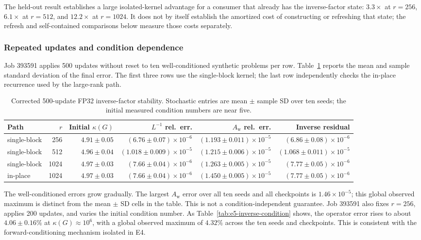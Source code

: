 \documentclass[11pt]{article}
\newcommand{\Aw}{A_{\mathrm w}}
\begin{document}
The held-out result establishes a large isolated-kernel advantage for a
consumer that already has the inverse-factor state: \(3.3\times\) at
\(r=256\), \(6.1\times\) at \(r=512\), and \(12.2\times\) at
\(r=1024\).  It does not by itself establish the amortized cost of constructing
or refreshing that state; the refresh and self-contained comparisons below
measure those costs separately.

\subsubsection{Repeated updates and condition dependence}

Job 393591 applies 500 updates without reset to ten well-conditioned
synthetic problems per row.  Table~\ref{tab:e5-inverse-stability} reports the
mean and sample standard deviation of the final error.  The first three rows
use the single-block
kernel; the last row independently checks the in-place recurrence used by the
large-rank path.

\begin{table}[ht]
\centering
\scriptsize
\caption{Corrected 500-update FP32 inverse-factor stability.  Stochastic
entries are mean \(\pm\) sample SD over ten seeds; the initial measured
condition numbers are near five.}
\label{tab:e5-inverse-stability}
{\setlength{\tabcolsep}{3pt}
\begin{tabular}{@{}lrrrrr@{}}
\toprule
Path & \(r\) & Initial \(\kappa(G)\) &
\(L^{-1}\) rel.\ err. & \(\Aw\) rel.\ err. & Inverse residual \\
\midrule
single-block & 256  & \(4.91\pm0.05\) &
  \((6.76\pm0.07)\times10^{-6}\) & \((1.193\pm0.011)\times10^{-5}\) &
  \((6.86\pm0.08)\times10^{-6}\) \\
single-block & 512  & \(4.96\pm0.04\) &
  \((1.018\pm0.009)\times10^{-5}\) & \((1.215\pm0.006)\times10^{-5}\) &
  \((1.068\pm0.011)\times10^{-5}\) \\
single-block & 1024 & \(4.97\pm0.03\) &
  \((7.66\pm0.04)\times10^{-6}\) & \((1.263\pm0.005)\times10^{-5}\) &
  \((7.77\pm0.05)\times10^{-6}\) \\
in-place     & 1024 & \(4.97\pm0.03\) &
  \((7.66\pm0.04)\times10^{-6}\) & \((1.450\pm0.005)\times10^{-5}\) &
  \((7.77\pm0.05)\times10^{-6}\) \\
\bottomrule
\end{tabular}
}
\end{table}

The well-conditioned errors grow gradually.  The largest \(\Aw\) error over
all ten seeds and all checkpoints is \(1.46\times10^{-5}\); this global
observed maximum is distinct from the mean \(\pm\) SD cells in the table.
This is not a condition-independent guarantee.  Job 393591 also fixes
\(r=256\), applies 200 updates, and varies the initial condition number.  As
Table~\ref{tab:e5-inverse-condition} shows, the operator error rises to about
\(4.06\pm0.16\%\) at \(\kappa(G)\approx10^6\), with a global observed maximum
of \(4.32\%\) across the ten seeds and checkpoints.  This is consistent with
the forward-conditioning mechanism isolated in E4.
\end{document}
